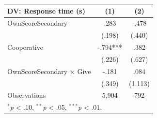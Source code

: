\begingroup
\centering
\begin{tabular*}{\linewidth}{@{\extracolsep{\fill}}lcc}
   \toprule
   DV: Response time (s) & \multicolumn{1}{c}{(1)} & \multicolumn{1}{c}{(2)}\\
   \midrule
   OwnScoreSecondary & \mbox{\hphantom{8}.283\hphantom{888}} & \mbox{\hphantom{8}-.478\hphantom{8}}\\
    & \mbox{(.198)\hphantom{88}} & \mbox{\hphantom{8}(.440)}\\
   Cooperative & \mbox{-.794***} & \mbox{\hphantom{88}.382\hphantom{8}}\\
    & \mbox{(.226)\hphantom{88}} & \mbox{\hphantom{8}(.627)}\\
   OwnScoreSecondary $\times$ Give & \mbox{-.181\hphantom{888}} & \mbox{\hphantom{88}.084\hphantom{8}}\\
    & \mbox{(.349)\hphantom{88}} & \mbox{(1.113)}\\
   \midrule
   Observations & 5,904 & 792\\
   \multicolumn{3}{l}{\footnotesize $^{*}$\textit{p} < .10, $^{**}$\textit{p} < .05, $^{***}$\textit{p} < .01.}\\
   \bottomrule
\end{tabular*}
\par\endgroup
